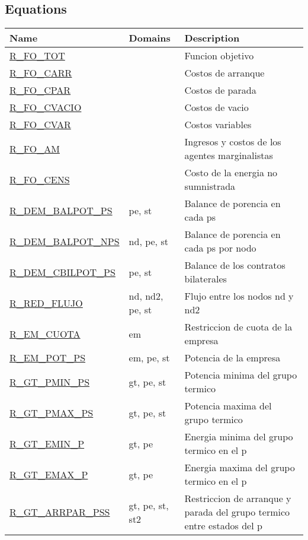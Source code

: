 \documentclass[11pt]{article}
\begin{document}
\subsection*{Equations}
\begin{tabular}{|l|l|l|} 
\hline 
\textbf{Name} & \textbf{Domains} & \textbf{Description}\\ 
\hline 
 
\hyperref[R_FO_TOT]{R\_FO\_TOT} &  & Funcion objetivo \\ 
\hyperref[R_FO_CARR]{R\_FO\_CARR} &  & Costos de arranque \\ 
\hyperref[R_FO_CPAR]{R\_FO\_CPAR} &  & Costos de parada \\ 
\hyperref[R_FO_CVACIO]{R\_FO\_CVACIO} &  & Costos de vacio \\ 
\hyperref[R_FO_CVAR]{R\_FO\_CVAR} &  & Costos variables \\ 
\hyperref[R_FO_AM]{R\_FO\_AM} &  & Ingresos y costos de los agentes marginalistas \\ 
\hyperref[R_FO_CENS]{R\_FO\_CENS} &  & Costo de la energia no sumnistrada \\ 
\hyperref[R_DEM_BALPOT_PS]{R\_DEM\_BALPOT\_PS} & pe, st & Balance de porencia en cada ps \\ 
\hyperref[R_DEM_BALPOT_NPS]{R\_DEM\_BALPOT\_NPS} & nd, pe, st & Balance de porencia en cada ps por nodo \\ 
\hyperref[R_DEM_CBILPOT_PS]{R\_DEM\_CBILPOT\_PS} & pe, st & Balance de los contratos bilaterales \\ 
\hyperref[R_RED_FLUJO]{R\_RED\_FLUJO} & nd, nd2, pe, st & Flujo entre los nodos nd y nd2 \\ 
\hyperref[R_EM_CUOTA]{R\_EM\_CUOTA} & em & Restriccion de cuota de la empresa \\ 
\hyperref[R_EM_POT_PS]{R\_EM\_POT\_PS} & em, pe, st & Potencia de la empresa \\ 
\hyperref[R_GT_PMIN_PS]{R\_GT\_PMIN\_PS} & gt, pe, st & Potencia minima del grupo termico \\ 
\hyperref[R_GT_PMAX_PS]{R\_GT\_PMAX\_PS} & gt, pe, st & Potencia maxima del grupo termico \\ 
\hyperref[R_GT_EMIN_P]{R\_GT\_EMIN\_P} & gt, pe & Energia minima del grupo termico en el p \\ 
\hyperref[R_GT_EMAX_P]{R\_GT\_EMAX\_P} & gt, pe & Energia maxima del grupo termico en el p \\ 
\hyperref[R_GT_ARRPAR_PSS]{R\_GT\_ARRPAR\_PSS} & gt, pe, st, st2 & Restriccion de arranque y parada del grupo termico entre estados del p \\ 

\end{tabular}
\end{document}
